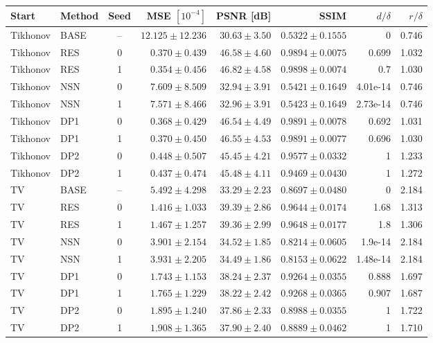 \begingroup\small\setlength{\tabcolsep}{4pt}\renewcommand{\arraystretch}{1.1}
\begin{tabular}{@{}llcrrrrr@{}}
\toprule
Start & Method & Seed & MSE $[10^{-4}]$ & PSNR [dB] & SSIM & $d/\delta$ & $r/\delta$ \\ \midrule
Tikhonov & BASE & -- & $12.125\pm12.236$ & $30.63\pm3.50$ & $0.5322\pm0.1555$ & 0 & 0.746 \\
Tikhonov & RES & 0 & $0.370\pm0.439$ & $46.58\pm4.60$ & $0.9894\pm0.0075$ & 0.699 & 1.032 \\
Tikhonov & RES & 1 & $0.354\pm0.456$ & $46.82\pm4.58$ & $0.9898\pm0.0074$ & 0.7 & 1.030 \\
Tikhonov & NSN & 0 & $7.609\pm8.509$ & $32.94\pm3.91$ & $0.5421\pm0.1649$ & 4.01e-14 & 0.746 \\
Tikhonov & NSN & 1 & $7.571\pm8.466$ & $32.96\pm3.91$ & $0.5423\pm0.1649$ & 2.73e-14 & 0.746 \\
Tikhonov & DP1 & 0 & $0.368\pm0.429$ & $46.54\pm4.49$ & $0.9891\pm0.0078$ & 0.692 & 1.031 \\
Tikhonov & DP1 & 1 & $0.370\pm0.450$ & $46.55\pm4.53$ & $0.9891\pm0.0077$ & 0.696 & 1.030 \\
Tikhonov & DP2 & 0 & $0.448\pm0.507$ & $45.45\pm4.21$ & $0.9577\pm0.0332$ & 1 & 1.233 \\
Tikhonov & DP2 & 1 & $0.437\pm0.474$ & $45.48\pm4.11$ & $0.9469\pm0.0430$ & 1 & 1.272 \\
TV & BASE & -- & $5.492\pm4.298$ & $33.29\pm2.23$ & $0.8697\pm0.0480$ & 0 & 2.184 \\
TV & RES & 0 & $1.416\pm1.033$ & $39.39\pm2.86$ & $0.9644\pm0.0174$ & 1.68 & 1.313 \\
TV & RES & 1 & $1.467\pm1.257$ & $39.36\pm2.99$ & $0.9648\pm0.0177$ & 1.8 & 1.306 \\
TV & NSN & 0 & $3.901\pm2.154$ & $34.52\pm1.85$ & $0.8214\pm0.0605$ & 1.9e-14 & 2.184 \\
TV & NSN & 1 & $3.931\pm2.205$ & $34.49\pm1.86$ & $0.8153\pm0.0622$ & 1.48e-14 & 2.184 \\
TV & DP1 & 0 & $1.743\pm1.153$ & $38.24\pm2.37$ & $0.9264\pm0.0355$ & 0.888 & 1.697 \\
TV & DP1 & 1 & $1.765\pm1.229$ & $38.22\pm2.42$ & $0.9268\pm0.0365$ & 0.907 & 1.687 \\
TV & DP2 & 0 & $1.895\pm1.240$ & $37.86\pm2.33$ & $0.8988\pm0.0355$ & 1 & 1.722 \\
TV & DP2 & 1 & $1.908\pm1.365$ & $37.90\pm2.40$ & $0.8889\pm0.0462$ & 1 & 1.710 \\
\bottomrule
\end{tabular}\endgroup
